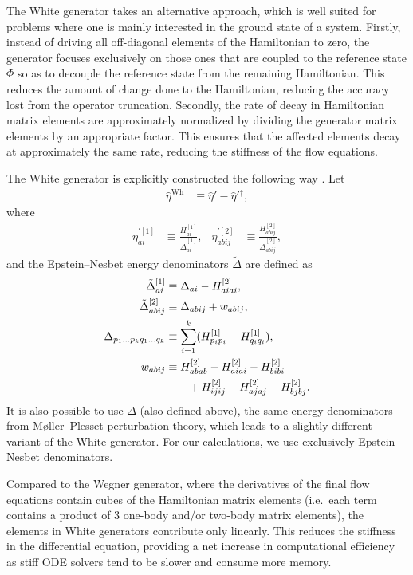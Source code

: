 The White generator takes an alternative approach, which is well
suited for problems where one is mainly interested in the ground state
of a system.  Firstly, instead of driving all off-diagonal elements of
the Hamiltonian to zero, the generator focuses exclusively on those
ones that are coupled to the reference state $\Phi$ so as to decouple
the reference state from the remaining Hamiltonian.  This reduces the
amount of change done to the Hamiltonian, reducing the accuracy lost
from the operator truncation.  Secondly, the rate of decay in
Hamiltonian matrix elements are approximately normalized by dividing
the generator matrix elements by an appropriate factor.  This ensures
that the affected elements decay at approximately the same rate,
reducing the stiffness of the flow equations.

The White generator is explicitly constructed the following way \cite{PhysRevLett.106.222502,White:cond-mat0201346}.  Let
\begin{align*}
\hat{\eta}^{\text{Wh}} &\equiv \hat{\eta}' - \hat{\eta}'{}^\dagger,
\end{align*}
where
\begin{align*}
\eta^{\prime [1]}_{a i} &\equiv \frac{H^{[1]}_{a i}}{\tilde{\Delta}^{[1]}_{a i}}, &
\eta^{\prime [2]}_{a b i j} &\equiv \frac{H^{[2]}_{a b i j}}{\tilde{\Delta}^{[2]}_{a b i j}},
\end{align*}
and the Epstein--Nesbet energy denominators $\tilde{\Delta}$ \cite{shavitt2009many} are defined as
\begin{align}
\tilde{\Delta}^{[1]}_{a i} &\equiv \Delta_{a i} - H^{[2]}_{a i a i}, \notag \\
\tilde{\Delta}^{[2]}_{a b i j} &\equiv \Delta_{a b i j} + w_{a b i j}, \notag \\
\Delta_{p_1 \ldots p_k q_1 \ldots q_k} &\equiv \sum_{i = 1}^k (H^{[1]}_{p_i p_i} -  H^{[1]}_{q_i q_i}), \label{eq:moellerplessetdenominator} \\
w_{a b i j}
  &\equiv H^{[2]}_{a b a b} - H^{[2]}_{a i a i} - H^{[2]}_{b i b i} \notag \\
  &\qquad + H^{[2]}_{i j i j} - H^{[2]}_{a j a j} - H^{[2]}_{b j b j}. \notag
\end{align}
It is also possible \cite{IMSRG} to use $\Delta$ (also defined above), the same energy denominators from M\o ller--Plesset perturbation theory, which leads to a slightly different variant of the White generator.  For our calculations, we use exclusively Epstein--Nesbet denominators.

Compared to the Wegner generator, where the derivatives of the final flow equations contain cubes of the Hamiltonian matrix elements (i.e.\ each term contains a product of 3 one-body and/or two-body matrix elements), the elements in White generators contribute only linearly.  This reduces the stiffness in the differential equation, providing a net increase in computational efficiency as stiff ODE solvers tend to be slower and consume more memory.

